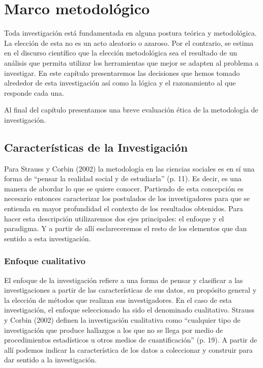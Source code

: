 \chapter{Marco metodológico}\label{ch:metodologia}
Toda investigación está fundamentada en alguna postura teórica y metodológica.
La elección de esta no es un acto aleatorio o azaroso.
Por el contrario, se estima en el discurso científico que la elección
metodológica sea el resultado de un análisis que permita utilizar los
herramientas que mejor se adapten al problema a investigar.
En este capítulo presentaremos las decisiones que hemos tomado alrededor de
esta investigación así como la lógica y el razonamiento al que responde cada
una.

Al final del capítulo presentamos una breve evaluación ética de la
metodología de investigación.

\section{Características de la Investigación}
Para Strauss y Corbin (2002) la metodología en las ciencias sociales es en sí
una forma de “pensar la realidad social y de estudiarla” (p. 11).
Es decir, es una manera de abordar lo que se quiere conocer.
Partiendo de esta concepción es necesario entonces caracterizar los postulados
de los investigadores para que se entienda en mayor profundidad el contexto de
los resultados obtenidos.
Para hacer esta descripción utilizaremos dos ejes principales: el enfoque y el
paradigma.
Y a partir de allí esclareceremos el resto de los elementos que dan sentido a
esta investigación.

\subsection{Enfoque cualitativo}
El enfoque de la investigación refiere a una forma de pensar y clasificar a las
investigaciones a partir de las características de sus datos, su propósito
general y la elección de métodos que realizan sus investigadores.
En el caso de esta investigación, el enfoque seleccionado ha sido el denominado
cualitativo.
Strauss y Corbin (2002) definen la investigación cualitativa como “cualquier
tipo de investigación que produce hallazgos a los que no se llega por medio de
procedimientos estadísticos u otros medios de cuantificación” (p. 19).
A partir de allí podemos indicar la característica de los datos a coleccionar y
construir para dar sentido a la investigación.


